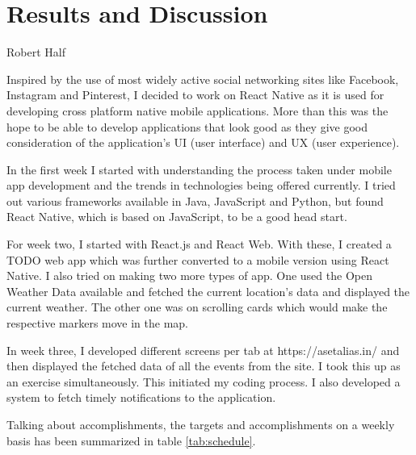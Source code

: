 \chapter{Results and Discussion}
\label{chap:resultsAndDiscussion}
\begin{epigraphs}
         {Robert Half}
\end{epigraphs}

Inspired by the use of most widely active social networking sites like Facebook, Instagram and Pinterest, I decided to work on React Native as it is used for developing cross platform native mobile applications.  More than this was the hope to be able to develop applications that look good as they give good consideration of the application's UI (user interface) and UX (user experience). \par \medskip
In the first week I started with understanding the process taken under mobile app development and the trends in technologies being offered currently. I tried out various frameworks available in Java, JavaScript and Python, but found React Native, which is based on JavaScript, to be a good head start.\par \medskip
For week two, I started with React.js and React Web. With these, I created a TODO web app which was further converted to a mobile version using React Native. I also tried on making two more types of app. One used the Open Weather Data available and fetched the current location's data and displayed the current weather. The other one was on scrolling cards which would make the respective markers move in the map. \par \medskip
In week three, I developed different screens per tab at https://asetalias.in/ and then displayed the fetched data of all the events from the site. I took this up as an exercise simultaneously. This initiated my coding process. I also developed a system to fetch timely notifications to the application. \par \bigskip
\newpage
Talking about accomplishments, the targets and accomplishments on a weekly basis has been summarized in table \ref{tab:schedule}.

